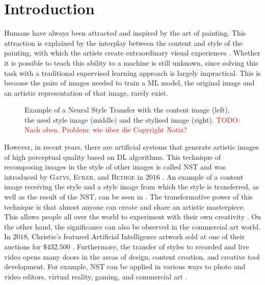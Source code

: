 \section{Introduction}
Humans have always been attracted and inspired by the art of painting. This attraction is explained by the interplay between the content and style of the painting, with which the artists create extraordinary visual experiences \cite{Glas2021}. Whether it is possible to teach this ability to a machine is still unknown, since solving this task with a traditional supervised learning approach is largely impractical. This is because the pairs of images needed to train a \gls{ML} model, the original image and an artistic representation of that image, rarely exist.
\begin{figure*}[!b]
	\centering
	
	\caption{Example of a Neural Style Transfer with the content image \contentimage{} (left), the used style image \styleimage{} (middle) and the stylised image \image{} (right). \textcolor{red}{TODO: Nach oben. Problem: wie über die Copyright Notiz?}}
	\label{fig:fig_nst}
\end{figure*}
 
However, in recent years, there are artificial systems that generate artistic images of high perceptual quality based on \gls{DL} algorithms. This technique of recomposing images in the style of other images is called \gls{NST} and was introduced by \textsc{Gatys}, \textsc{Ecker}, and \textsc{Bethge} in $2016$ \cite{GEB2016}. An example of a content image receiving the style and a style image from which the style is transferred, as well as the result of the \gls{NST}, can be seen in . The transformative power of this technique is that almost anyone can create and share an artistic masterpiece. This allows people all over the world to experiment with their own creativity \cite{Kel2018}. On the other hand, the significance can also be observed in the commercial art world. In $2018$, Christie's featured Artificial Intelligence artwork sold at one of their auctions for $\$432.500$ \cite{2018}. Furthermore, the transfer of styles to recorded and live video opens many doors in the areas of design, content creation, and creative tool development. For example, \gls{NST} can be applied in various ways to photo and video editors, virtual reality, gaming, and commercial art \cite{Glas2021, Ioa2021}.

